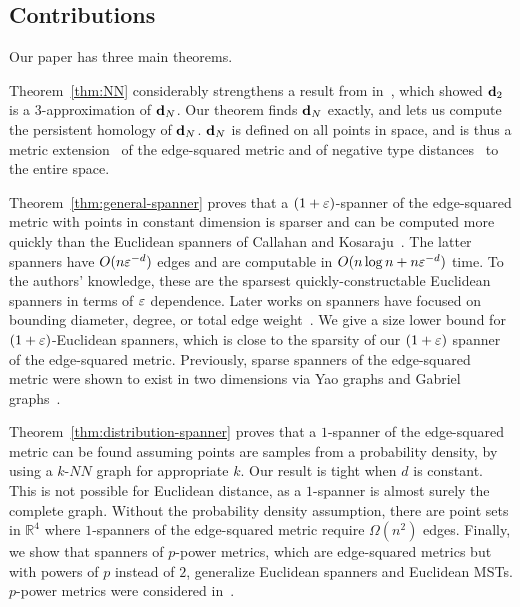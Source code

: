 \subsection{Contributions}
Our paper has three main theorems.

 

Theorem~\ref{thm:NN} considerably strengthens a result from
in~\cite{cohen15approximating}, which showed $\mathbf{d}_2$
is a $3$-approximation of $\mathbf{d}_N$. Our theorem finds $\mathbf{d}_N$
exactly, and lets us
compute the persistent homology of $\mathbf{d}_N$.
$\mathbf{d}_N$ is defined on all points in space,
and is thus a metric extension~\cite{Naor15} of the edge-squared
metric
and of negative type distances~\cite{Deza1997} to the
entire space.

Theorem~\ref{thm:general-spanner} proves that a $(1+\varepsilon)$-spanner of the edge-squared metric with points in constant dimension is sparser and can be computed more quickly than the Euclidean spanners of
Callahan and
Kosaraju~\cite{Callahan1993}. The latter spanners have
$O(n\varepsilon^{-d})$ edges and are computable in $O(n \log n +
n\varepsilon^{-d})$ time. To the authors' knowledge, these are the
sparsest quickly-constructable Euclidean spanners in terms of
$\varepsilon$ dependence. Later works on
spanners have focused on bounding diameter,
degree, or total edge weight~\cite{arya95euclid, Elkin2013}.
We give a size
lower bound for $(1+\varepsilon)$-Euclidean spanners, which is close
to the sparsity of our $(1+\varepsilon)$ spanner of the edge-squared
metric.
Previously, sparse spanners of the edge-squared metric were shown to exist in two
dimensions via Yao graphs and Gabriel graphs~\cite{LiWan2001}.

Theorem~\ref{thm:distribution-spanner} proves that a $1$-spanner of
the edge-squared metric can be found assuming points are samples from a
probability density, by using a $k$-$NN$ graph for
appropriate $k$. Our result is tight when $d$ is constant. This
is not possible for Euclidean distance, as a $1$-spanner is almost
surely the complete graph. Without the probability density
assumption, there are point sets in $\mathbb{R}^4$ where
$1$-spanners
of the edge-squared metric require $\Omega(n^2)$ edges.
Finally, we show that spanners of $p$-power metrics, which are
edge-squared metrics but with powers of $p$ instead of $2$, generalize
Euclidean spanners and Euclidean MSTs. $p$-power metrics were
considered in~\cite{LiWan2001}.

